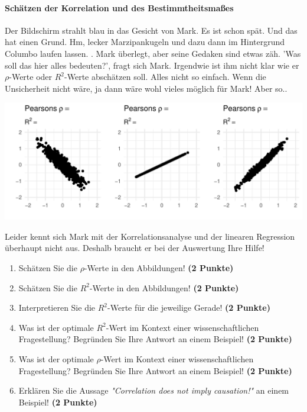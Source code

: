 \documentclass[a4paper, 9pt]{scrartcl}\usepackage[]{graphicx}\usepackage[]{xcolor}
\makeatletter
\def\maxwidth{ %
  \ifdim\Gin@nat@width>\linewidth
    \linewidth
  \else
    \Gin@nat@width
  \fi
}
\makeatother
\begin{document}
\paragraph{Schätzen der Korrelation und des Bestimmtheitsmaßes}

Der Bildschirm strahlt blau in das Gesicht von Mark. Es ist schon spät. Und das hat einen Grund. Hm, lecker Marzipankugeln und dazu dann im Hintergrund Columbo laufen lassen. . Mark überlegt, aber seine Gedaken sind etwas zäh. 'Was soll das hier alles bedeuten?', fragt sich Mark. Irgendwie ist ihm nicht klar wie er $\rho$-Werte oder $R^2$-Werte abschätzen soll. Alles nicht so einfach. Wenn die Unsicherheit nicht wäre, ja dann wäre wohl vieles möglich für Mark! Aber so.. 
\vspace{2Ex}



{\centering \includegraphics[width=\maxwidth]{img/correlation-02-1} 

}




Leider kennt sich Mark mit der Korrelationsanalyse und der linearen Regression überhaupt nicht aus. Deshalb braucht er bei der Auswertung Ihre Hilfe!

\begin{enumerate}
\item Schätzen Sie die $\rho$-Werte in den Abbildungen! \textbf{(2 Punkte)}
\item Schätzen Sie die $R^2$-Werte in den Abbildungen! \textbf{(2 Punkte)}
\item Interpretieren Sie die $R^2$-Werte für die jeweilige Gerade! \textbf{(2 Punkte)}
\item Was ist der optimale $R^2$-Wert im Kontext einer wissenschaftlichen Fragestellung? Begründen Sie Ihre Antwort an einem Beispiel! \textbf{(2 Punkte)}
\item Was ist der optimale $\rho$-Wert im Kontext einer wissenschaftlichen Fragestellung? Begründen Sie Ihre Antwort an einem Beispiel! \textbf{(2 Punkte)}
\item Erklären Sie die Aussage \textit{"Correlation does not imply causation!"} an einem Beispiel! \textbf{(2 Punkte)}
\end{enumerate} 
\clearpage
\end{document}
